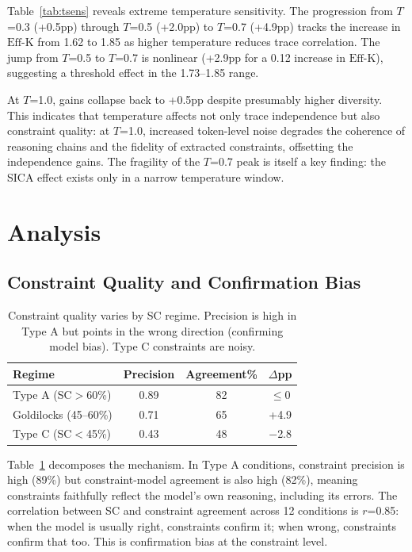 \documentclass[11pt,a4paper]{article}
\newcommand{\effk}{\text{Eff-K}}
\begin{document}
Table~\ref{tab:tsens} reveals extreme temperature sensitivity. The progression from $T$=0.3 (+0.5pp) through $T$=0.5 (+2.0pp) to $T$=0.7 (+4.9pp) tracks the increase in $\effk$ from 1.62 to 1.85 as higher temperature reduces trace correlation. The jump from $T$=0.5 to $T$=0.7 is nonlinear (+2.9pp for a 0.12 increase in $\effk$), suggesting a threshold effect in the 1.73--1.85 range.

At $T$=1.0, gains collapse back to +0.5pp despite presumably higher diversity. This indicates that temperature affects not only trace independence but also constraint quality: at $T$=1.0, increased token-level noise degrades the coherence of reasoning chains and the fidelity of extracted constraints, offsetting the independence gains. The fragility of the $T$=0.7 peak is itself a key finding: the SICA effect exists only in a narrow temperature window.

\section{Analysis}

\subsection{Constraint Quality and Confirmation Bias}

\begin{table}[t]
\centering
\small
\caption{Constraint quality varies by SC regime. Precision is high in Type A but points in the wrong direction (confirming model bias). Type C constraints are noisy.}
\label{tab:constraint_quality}
\begin{tabular}{lccc}
\toprule
\textbf{Regime} & \textbf{Precision} & \textbf{Agreement\%} & \textbf{$\Delta$pp} \\
\midrule
Type A (SC$>$60\%) & 0.89 & 82 & $\leq$0 \\
Goldilocks (45--60\%) & 0.71 & 65 & +4.9 \\
Type C (SC$<$45\%) & 0.43 & 48 & $-$2.8 \\
\bottomrule
\end{tabular}
\end{table}

Table~\ref{tab:constraint_quality} decomposes the mechanism. In Type A conditions, constraint precision is high (89\%) but constraint-model agreement is also high (82\%), meaning constraints faithfully reflect the model's own reasoning, including its errors. The correlation between SC and constraint agreement across 12 conditions is $r$=0.85: when the model is usually right, constraints confirm it; when wrong, constraints confirm that too. This is confirmation bias at the constraint level.
\end{document}
